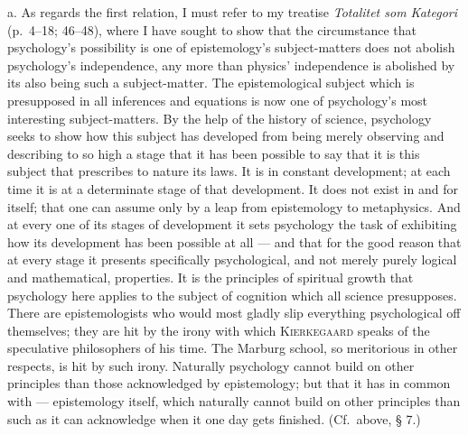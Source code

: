 \documentclass[12pt]{book}
\newcommand{\opage}[1]{\marginnote{\footnotesize\textit{[#1]}}}
\begin{document}
a. As regards the first relation, I must refer to my treatise \textit{Totalitet
som Kategori} (p.\ 4--18; 46--48), where I have sought to show that the
circumstance that psychology's possibility is one of epistemology's
subject-matters does not abolish psychology's independence, any more than
physics' independence is abolished by its also being such a subject-matter. The
epistemological subject which is presupposed in all inferences and equations is
now one of \opage{112}psychology's most interesting subject-matters. By the help of the
history of science, psychology seeks to show how this subject has developed from
being merely observing and describing to so high a stage that it has been possible
to say that it is this subject that prescribes to nature its laws. It is in
constant development; at each time it is at a determinate stage of that
development. It does not exist in and for itself; that one can assume only by a
leap from epistemology to metaphysics. And at every one of its stages of
development it sets psychology the task of exhibiting how its development has been
possible at all --- and that for the good reason that at every stage it presents
specifically psychological, and not merely purely logical and mathematical,
properties. It is the principles of spiritual growth that psychology here applies
to the subject of cognition which all science presupposes. There are
epistemologists who would most gladly slip everything psychological off
themselves; they are hit by the irony with which \textsc{Kierkegaard} speaks of
the speculative philosophers of his time. The Marburg school, so meritorious in
other respects, is hit by such irony. Naturally psychology cannot build on other
principles than those acknowledged by epistemology; but that it has in common
with --- epistemology itself, which naturally cannot build on other principles
than such as it can acknowledge when it one day gets finished. (Cf.\ above, § 7.)
\end{document}
